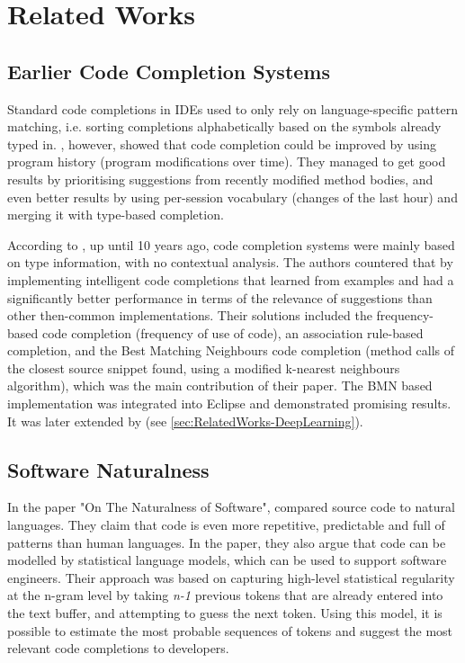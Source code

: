 \chapter{Related Works}
\label{chap:RelatedWorks}

\section{Earlier Code Completion Systems}
\label{sec:RelatedWorks-EarlierSystems}
Standard code completions in IDEs used to only rely on language-specific pattern matching, i.e. sorting completions alphabetically based on the symbols already typed in. \cite{Robb08a}, however, showed that code completion could be improved by using program history (program modifications over time). They managed to get good results by prioritising suggestions from recently modified method bodies, and even better results by using per-session vocabulary (changes of the last hour) and merging it with type-based completion.

According to \cite{Bruc09a}, up until 10 years ago, code completion systems were mainly based on type information, with no contextual analysis. The authors countered that by implementing intelligent code completions that learned from examples and had a significantly better performance in terms of the relevance of suggestions than other then-common implementations. Their solutions included the frequency-based code completion (frequency of use of code), an association rule-based completion, and the Best Matching Neighbours code completion (method calls of the closest source snippet found, using a modified k-nearest neighbours algorithm), which was the main contribution of their paper. The BMN based implementation was integrated into Eclipse and demonstrated promising results. It was later extended by \cite{Prok15a} (see \ref{sec:RelatedWorks-DeepLearning}).

\section{Software Naturalness}
\label{sec:RelatedWorks-SoftwareNaturalness}
In the paper "On The Naturalness of Software", \cite{Hind12a} compared source code to natural languages. They claim that code is even more repetitive, predictable and full of patterns than human languages. In the paper, they also argue that code can be modelled by statistical language models, which can be used to support software engineers. Their approach was based on capturing high-level statistical regularity at the n-gram level by taking \textit{n-1} previous tokens that are already entered into the text buffer, and attempting to guess the next token. Using this model, it is possible to estimate the most probable sequences of tokens and suggest the most relevant code completions to developers.

